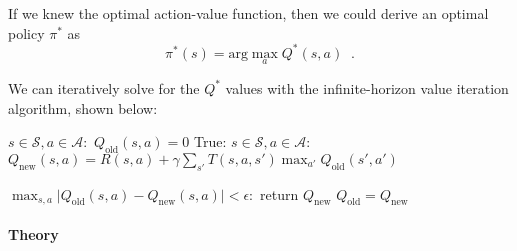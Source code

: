 If we knew the optimal action-value function, then  we could derive an
optimal policy  $\pi^*$ as
\begin{equation}
 \pi^*(s) = \text{arg}\max_{a}Q^*(s, a) \;\;.
\end{equation}

We can iteratively solve for the $Q^*$ values with the infinite-horizon
value iteration algorithm, shown below:

\begin{codebox}
  \li     \For $s \in \mathcal{S}, a \in \mathcal{A}:$
	\Do
  \li        $Q_{\text{old}}(s, a) = 0$
        \End
  \li     \While True:
        \Do
  \li        \For $s \in \mathcal{S}, a \in \mathcal{A}:$
           \Do
  \li           $Q_{\text{new}}(s, a) = R(s, a) + \gamma\sum_{s'}T(s, a, s')\max_{a'}Q_{\text{old}}(s', a')$
         \End

  \li      \If $\max_{s, a}\lvert Q_{\text{old}}(s, a) - Q_{\text{new}}(s, a)\rvert < \epsilon:$
         \Do
  \li           return $Q_{\text{new}}$
        \End
  \li      $Q_{\text{old}} = Q_{\text{new}}$
	\End
\end{codebox}

\paragraph*{Theory}

